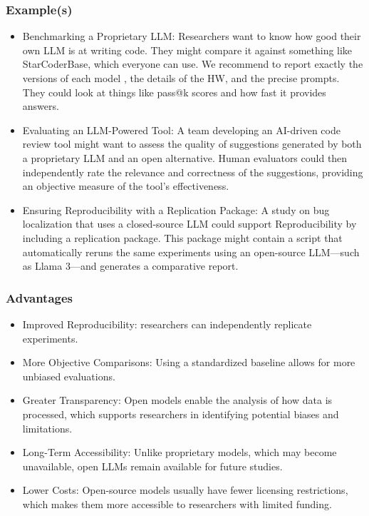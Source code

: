 \documentclass[11pt]{article}
\begin{document}
\subsubsection{Example(s)}
\begin{itemize}
    \item Benchmarking a Proprietary LLM: Researchers want to know how good their own LLM is at writing code. They might compare it against something like StarCoderBase, which everyone can use. We recommend to report exactly the versions of each model , the details of the HW, and the precise prompts. They could look at things like pass@k scores and how fast it provides answers.
    \item Evaluating an LLM-Powered Tool: A team developing an AI-driven code review tool might want to assess the quality of suggestions generated by both a proprietary LLM and an open alternative. Human evaluators could then independently rate the relevance and correctness of the suggestions, providing an objective measure of the tool's effectiveness.
    \item Ensuring Reproducibility with a Replication Package: A study on bug localization that uses a closed-source LLM could support Reproducibility by including a replication package. This package might contain a script that automatically reruns the same experiments using an open-source LLM—such as Llama 3—and generates a comparative report.
\end{itemize}

\subsubsection{Advantages}
\begin{itemize}
    \item	Improved Reproducibility: researchers can independently replicate experiments.
    \item	More Objective Comparisons: Using a standardized baseline allows for more unbiased evaluations.
    \item	Greater Transparency: Open models enable the analysis of how data is processed, which supports researchers in identifying potential biases and limitations.
    \item	Long-Term Accessibility: Unlike proprietary models, which may become unavailable, open LLMs remain available for future studies.
    \item	Lower Costs: Open-source models usually have fewer licensing restrictions, which makes them more accessible to researchers with limited funding.
\end{itemize}
\end{document}
